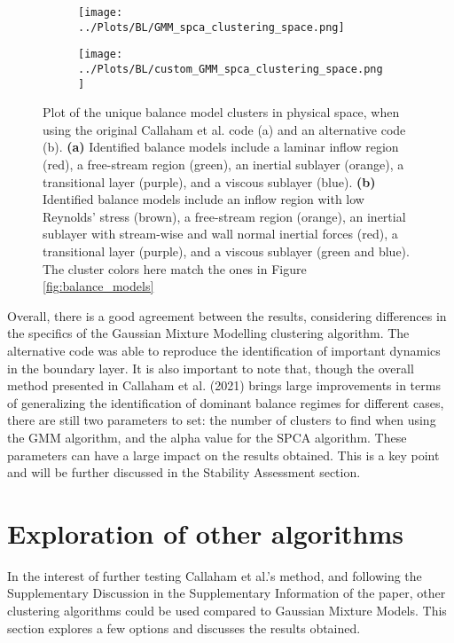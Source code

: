 \documentclass[12pt]{report} %
\begin{document}
\begin{figure}[htbp]
  \centering
  \begin{subfigure}[b]{0.7\textwidth}
      \texttt{[image: ../Plots/BL/GMM\_spca\_clustering\_space.png]}
      \caption{}
  \end{subfigure}
  \begin{subfigure}[b]{0.7\textwidth}
      \texttt{[image: ../Plots/BL/custom\_GMM\_spca\_clustering\_space.png]}
      \caption{}
  \end{subfigure}
  \caption{Plot of the unique balance model clusters in physical space, when using the original Callaham et al. code (a) and an alternative code (b). \textbf{(a)} Identified balance models include a laminar inflow region (red), a free-stream region (green), an inertial sublayer (orange), a transitional layer (purple), and a viscous sublayer (blue). \textbf{(b)} Identified balance models include an inflow region with low Reynolds' stress (brown), a free-stream region (orange), an inertial sublayer with stream-wise and wall normal inertial forces (red), a transitional layer (purple), and a viscous sublayer (green and blue). The cluster colors here match the ones in Figure \ref{fig:balance_models}}
  \label{fig:balance_model_clusters}
\end{figure}

Overall, there is a good agreement between the results, considering differences in the specifics of the Gaussian Mixture Modelling clustering algorithm. The alternative code was able to reproduce the identification of important dynamics in the boundary layer. It is also important to note that, though the overall method presented in Callaham et al. (2021)\cite{callaham2021learning} brings large improvements in terms of generalizing the identification of dominant balance regimes for different cases, there are still two parameters to set: the number of clusters to find when using the GMM algorithm, and the alpha value for the SPCA algorithm. These parameters can have a large impact on the results obtained. This is a key point and will be further discussed in the Stability Assessment section.

\newpage

\section{Exploration of other algorithms}

In the interest of further testing Callaham et al.’s method, and following the Supplementary Discussion in the Supplementary Information of the paper\cite{callaham2021learning}, other clustering algorithms could be used compared to Gaussian Mixture Models. This section explores a few options and discusses the results obtained.
\end{document}
